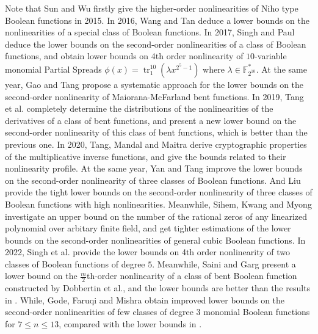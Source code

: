 \documentclass[8pt,oneside]{article}
\newcommand{\0}{\textbf{0}}
\newcommand{\1}{\textbf{1}}
\newcommand{\F}{\mathbb{F}}
\begin{document}
    Note that Sun and Wu firstly give the higher-order nonlinearities of Niho type Boolean functions\cite{SunW2015NLr_Niho} in 2015. 
    In 2016, Wang and Tan deduce a lower bounds on the nonlinearities of a special class of Boolean functions\cite{WangT2016NL_2}. 
    In 2017, Singh and Paul deduce the lower bounds on the second-order nonlinearities of a class of 
    Boolean functions, and obtain lower bounds on 4th order nonlinearity of $ 10 $-variable monomial Partial Spreads 
    $ \phi(x)=\operatorname{tr}_1^{10}(\lambda x^{2^5-1}) $ where $ \lambda\in\F_{2^{10}}^* $\cite{SinghP2017NL_2_4}. 
    At the same year, Gao and Tang propose a systematic approach for the lower bounds on the second-order nonlinearity of 
    Maiorana-McFarland bent functions\cite{GaoT2017NL_2_MM}. 
    In 2019, Tang et al.\cite{TangYZZ2020NL_2bent} completely determine the distributions of the nonlinearities of 
    the derivatives of a class of bent functions, and present a new lower bound on the second-order nonlinearity of 
    this class of bent functions, which is better than the previous one. 
    In 2020, Tang, Mandal and Maitra\cite{TangMM2022inversefunction} derive cryptographic properties of 
    the multiplicative inverse functions, and give the bounds related to their nonlinearity profile. 
    At the same year, Yan and Tang improve the lower bounds on the second-order nonlinearity of three classes of Boolean functions\cite{YanT2020NL_2}. 
    And Liu\cite{Liu2023NL_2} provide the tight lower bounds on the second-order nonlinearity of 
    three classes of Boolean functions with high nonlinearities. 
    Meanwhile, Sihem, Kwang and Myong\cite{MesnagerKJ2020NL_2cubic} investigate an upper bound 
    on the number of the rational zeros of any linearized polynomial over arbitary finite field, 
    and get tighter estimations of the lower bounds on the second-order nonlinearities of general cubic Boolean functions. 
    In 2022, Singh et al. provide the lower bounds on 4th order nonlinearity of two classes of Boolean functions 
    of degree $ 5 $\cite{SinghPKSV2022res_NL_profile}. 
    Meanwhile, Saini and Garg\cite{SainiG2022NL_r_Niho} present a lower bound on the $ \frac{m}{2} $th-order nonlinearity of a class of 
    bent Boolean function constructed by Dobbertin et al.\cite{DobbertinLCCFG2006bent_Niho}, and the lower bounds 
    are better than the results in \cite{GodeG2009NL_2_cubicmonomial,GodeG2010NL_3Kasami,Singh2014NL_3_biquadratic}. 
    While, Gode, Faruqi and Mishra\cite{GodeFM2022NL_2cubic} obtain improved lower bounds on the second-order 
    nonlinearities of few classes of degree $ 3 $ monomial Boolean functions for $ 7\le n\le 13 $, compared with 
    the lower bounds in \cite{GodeG2009NL_2_cubicmonomial,LiHG11BNL_2,MesnagerKJ2020NL_2cubic}.
\end{document}
